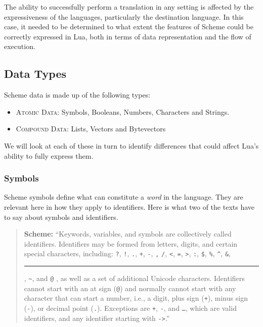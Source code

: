 The ability to successfully perform a translation in any setting is affected by
the expressiveness of the languages, particularly the destination language. In
this case, it needed to be determined to what extent the features of Scheme
could be correctly expressed in Lua, both in terms of data representation and
the flow of execution.

\subsection{Data Types}

Scheme data is made up of the following
types:~\cite[Appendix~(Formal~Syntax)]{tspl}
\begin{itemize}
\item \textsc{Atomic Data}: Symbols, Booleans, Numbers, Characters and Strings.
\item \textsc{Compound Data}: Lists, Vectors and Bytevectors
\end{itemize}

We will look at each of these in turn to identify differences that could affect
Lua's ability to fully express them.

\subsubsection{Symbols}

Scheme symbols define what can constitute a \emph{word} in the language. They
are relevant here in how they apply to identifiers. Here is what two of the
texts have to say about symbols and identifiers.

\begin{quote}\textbf{Scheme:}
``Keywords, variables, and symbols are collectively called identifiers.
Identifiers may be formed from letters, digits, and certain special characters,
including: \texttt ?, \texttt !, \texttt ., \texttt +, \texttt -, \texttt *,
\texttt /, \texttt <, \texttt =, \texttt >, \texttt :, \texttt \$, \texttt \%,
\texttt \^{}, \texttt \&, \rule{3mm}{0.2mm}, \texttt \~{}, and \texttt @ , as
well as a set of additional Unicode characters.  Identifiers cannot start with
an at sign (\texttt @) and normally cannot start with any character that can
start a number, i.e., a digit, plus sign (\texttt +), minus sign (\texttt -), or
decimal point (\texttt .). Exceptions are \texttt +, \texttt -, and \texttt
\ldots, which are valid identifiers, and any identifier starting with
\texttt{->}.''~\cite[Sec~1.1]{tspl}
\end{quote}

